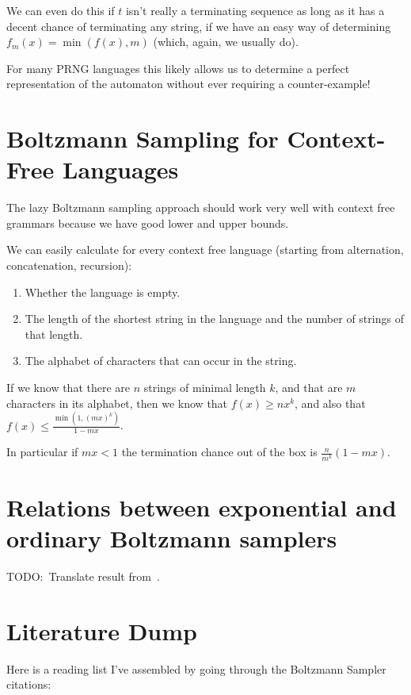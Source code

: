 We can even do this if \(t\) isn't really a terminating sequence as long as it has a decent chance of terminating any string,
if we have an easy way of determining \(f_m(x) = \min(f(x), m)\) (which, again, we usually do).

For many PRNG languages this likely allows us to determine a perfect representation of the automaton without ever requiring a counter-example!

\section{Boltzmann Sampling for Context-Free Languages}

The lazy Boltzmann sampling approach should work very well with context free grammars because we have good lower and upper bounds.

We can easily calculate for every context free language (starting from alternation, concatenation, recursion):

\begin{enumerate}
\item Whether the language is empty.
\item The length of the shortest string in the language and the number of strings of that length.
\item The alphabet of characters that can occur in the string.
\end{enumerate}

If we know that there are \(n\) strings of minimal length \(k\),
and that are \(m\) characters in its alphabet,
then we know that \(f(x) \geq n x^k\),
and also that \(f(x) \leq \frac{\min(1, {(mx)}^k)}{1 - m x}\).

In particular if \(mx < 1\) the termination chance out of the box is \(\frac{n}{m^k} (1 - mx)\).

\section{Relations between exponential and ordinary Boltzmann samplers}

TODO:\ Translate result from~\cite{DBLP:journals/corr/abs-1006-2902}.

\section{Literature Dump}

Here is a reading list I've assembled by going through the Boltzmann Sampler citations:

